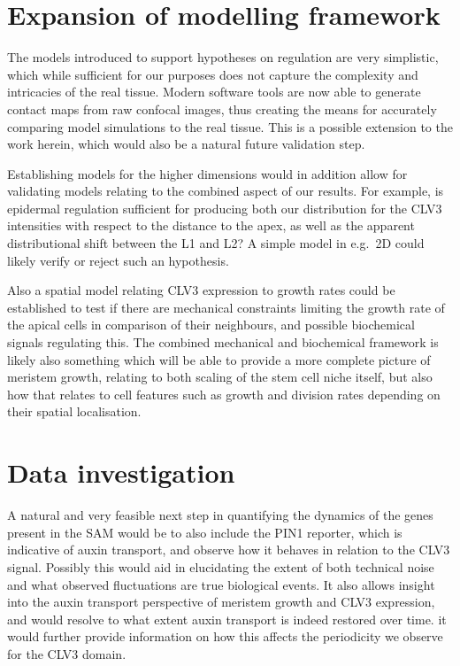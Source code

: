 \section{Expansion of modelling framework}
The models introduced to support hypotheses on regulation are very simplistic,
which while sufficient for  
our purposes does not capture the complexity and intricacies of the real tissue.
Modern software tools are now able to generate contact maps from raw confocal
images, thus creating the means for accurately comparing model simulations to
the real tissue. This is a possible extension to the work herein, which would
also be a natural future validation step. 

Establishing models for the higher dimensions would in addition allow for validating
models relating to the combined aspect of our results. For example, is epidermal
regulation sufficient for producing both our distribution for the CLV3
intensities with respect to the distance to the apex, as well as the apparent
distributional shift between the L1 and L2? A simple model in e.g.\ 2D could
likely verify or reject such an hypothesis.

Also a spatial model relating CLV3 expression to growth rates could be established to test if
there are mechanical constraints limiting the growth rate of the apical cells in
comparison of their neighbours, and possible biochemical signals regulating
this. The combined mechanical and biochemical framework is likely also something
which will be able to provide a more complete picture of meristem growth,
relating to both scaling of the stem cell niche itself, but also how that
relates to cell features such as growth and division rates depending on their
spatial localisation.

\section{Data investigation}
A natural and very feasible next step in quantifying the dynamics of the genes
present in the SAM would be to also include the PIN1 reporter, which is indicative of
auxin transport, and observe how it behaves in relation to the CLV3 signal.
Possibly this would aid in elucidating
the extent of both technical noise and what observed fluctuations are true
biological events. It also allows insight into the auxin transport
perspective of meristem growth and CLV3 expression, and would resolve to what
extent auxin transport is indeed restored over time. it would further provide
information on how this affects the periodicity we observe for the CLV3 domain.

